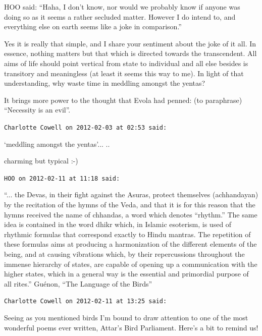 \begin{footnotesize}
\begin{sffamily}
HOO said: ``Haha, I don't know, nor would we probably know if anyone was doing so as it seems a rather secluded matter. However I do intend to, and everything else on earth seems like a joke in comparison.''

Yes it is really that simple, and I share your sentiment about the joke of it all. In essence, nothing matters but that which is directed towards the transcendent. All aims of life should point vertical from state to individual and all else besides is transitory and meaningless (at least it seems this way to me). In light of that understanding, why waste time in meddling amongst the yentas?

It brings more power to the thought that Evola had penned: (to paraphrase) ``Necessity is an evil''.

\hfill

\texttt{Charlotte Cowell on 2012-02-03 at 02:53 said:}

`meddling amongst the yentas'... ..

charming but typical :-)

\hfill

\texttt{HOO on 2012-02-11 at 11:18 said:}

``... the Devas, in their fight against the Asuras, protect themselves (achhandayan) by the recitation of the hymns of the Veda, and that it is for this reason that the hymns received the name of chhandas, a word which denotes ``rhythm.'' The same idea is contained in the word dhikr which, in Islamic esoterism, is used of rhythmic formulas that correspond exactly to Hindu mantras. The repetition of these formulas aims at producing a harmonization of the different elements of the being, and at causing vibrations which, by their repercussions throughout the immense hierarchy of states, are capable of opening up a communication with the higher states, which in a general way is the essential and primordial purpose of all rites.'' Guénon, ``The Language of the Birds'' \hfill

\texttt{Charlotte Cowell on 2012-02-11 at 13:25 said:}

Seeing as you mentioned birds I'm bound to draw attention to one of the most wonderful poems ever written, Attar's Bird Parliament. Here's a bit to remind us!


\end{sffamily}
\end{footnotesize}
